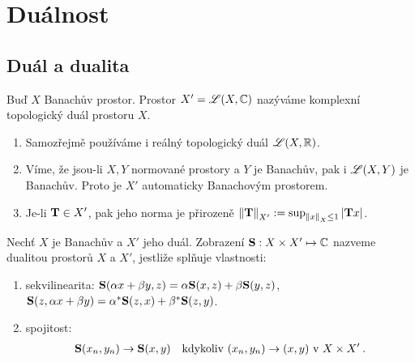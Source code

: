 %





\section{Duálnost}

\subsection{Duál a dualita}

\begin{definition}[Duál]
Buď $X$ Banachův prostor. Prostor $X'= \mathscr{L}(X,\mathbb{C})$ nazýváme komplexní topologický duál prostoru $X$.
\end{definition}
\begin{remark}
\begin{enumerate}
    \item Samozřejmě používáme i reálný topologický duál $\mathscr{L} (X,\mathbb{R})$.
    \item Víme, že jsou-li $X,Y$ normované prostory a $Y$ je Banachův, pak i $\mathscr{L} (X,Y)$ je Banachův. Proto je $X'$ automaticky Banachovým prostorem.
    \item Je-li $\mathbf{T} \in X'$, pak jeho norma je přirozeně $\left\lVert\mathbf{T}\right\rVert_{X'} := \sup_{\left\lVert x\right\rVert_X \leq 1} |\mathbf{T}x|$.
\end{enumerate}
\end{remark}

\begin{definition}
Nechť $X$ je Banachův a $X'$ jeho duál. Zobrazení $\mathbf{S} : X \times X' \mapsto \mathbb{C}$ nazveme dualitou prostorů $X$ a $X'$, jestliže splňuje vlastnosti: \begin{enumerate}
    \item sekvilinearita: $\mathbf{S}(\alpha x + \beta y, z) = \alpha \mathbf{S}(x,z) + \beta \mathbf{S}(y,z)$, $\mathbf{S}(z,\alpha x + \beta y) = \alpha^* \mathbf{S}(z,x) + \beta^* \mathbf{S}(z,y)$.
    \item spojitost: \begin{align*}
        \mathbf{S}(x_n,y_n) \rightarrow \mathbf{S}(x,y) \quad \text{kdykoliv } (x_n,y_n) \rightarrow (x,y) \text{ v } X \times X' \:.
    \end{align*}
\end{enumerate}
\end{definition}

